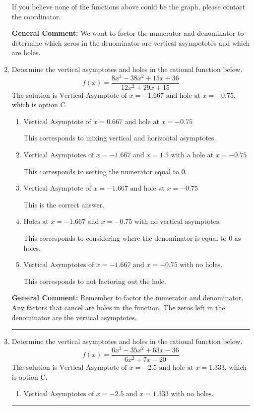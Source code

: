\documentclass{extbook}[14pt]
\newcommand{\litem}[1]{\item #1

\rule{\textwidth}{0.4pt}}
\begin{document}
\begin{enumerate}
{\begin{enumerate}[label=\Alph*.]
If you believe none of the functions above could be the graph, please contact the coordinator.
\end{enumerate}

\textbf{General Comment:} We want to factor the numerator and denominator to determine which zeros in the denominator are vertical asympototes and which are holes.
}
\litem{
Determine the vertical asymptotes and holes in the rational function below.
\[ f(x) = \frac{8x^{3} -38 x^{2} +15 x + 36}{12x^{2} +29 x + 15} \]The solution is \( \text{Vertical Asymptote of } x = -1.667 \text{ and hole at } x = -0.75 \), which is option C.\begin{enumerate}[label=\Alph*.]
\item \( \text{Vertical Asymptote of } x = 0.667 \text{ and hole at } x = -0.75 \)

This corresponds to mixing vertical and horizontal asymptotes.
\item \( \text{Vertical Asymptotes of } x = -1.667 \text{ and } x = 1.5 \text{ with a hole at } x = -0.75 \)

This corresponds to setting the numerator equal to 0.
\item \( \text{Vertical Asymptote of } x = -1.667 \text{ and hole at } x = -0.75 \)

This is the correct answer.
\item \( \text{Holes at } x = -1.667 \text{ and } x = -0.75 \text{ with no vertical asymptotes.} \)

This corresponds to considering where the denominator is equal to 0 as holes.
\item \( \text{Vertical Asymptotes of } x = -1.667 \text{ and } x = -0.75 \text{ with no holes.} \)

This corresponds to not factoring out the hole.
\end{enumerate}

\textbf{General Comment:} Remember to factor the numerator and denominator. Any factors that cancel are holes in the function. The zeros left in the denominator are the vertical asymptotes.
}
\litem{
Determine the vertical asymptotes and holes in the rational function below.
\[ f(x) = \frac{6x^{3} -35 x^{2} +63 x -36}{6x^{2} +7 x -20} \]The solution is \( \text{Vertical Asymptote of } x = -2.5 \text{ and hole at } x = 1.333 \), which is option C.\begin{enumerate}[label=\Alph*.]
\item \( \text{Vertical Asymptotes of } x = -2.5 \text{ and } x = 1.333 \text{ with no holes.} \)


\end{enumerate}}
\end{enumerate}
\end{document}
